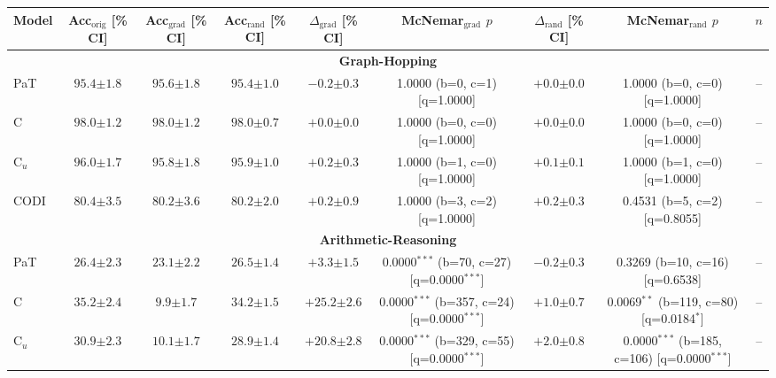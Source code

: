 \begin{table}[h!]
\centering
\small
\setlength{\tabcolsep}{3pt}
\begin{tabular}{l ccc cc cc c}
\toprule
Model & Acc$_{\text{orig}}$ [\% CI] & Acc$_{\text{grad}}$ [\% CI] & Acc$_{\text{rand}}$ [\% CI] & $\Delta_{\text{grad}}$ [\% CI] & McNemar$_{\text{grad}}$ $p$ & $\Delta_{\text{rand}}$ [\% CI] & McNemar$_{\text{rand}}$ $p$ & $n$ \\
\midrule
\multicolumn{9}{c}{\textbf{Graph-Hopping}} \\
\midrule
PaT & $95.4 {\scriptstyle \pm 1.8}$ & $95.6 {\scriptstyle \pm 1.8}$ & $95.4 {\scriptstyle \pm 1.0}$ & $-0.2 {\scriptstyle \pm 0.3}$ & 1.0000 (b=0, c=1) [q=1.0000] & $+0.0 {\scriptstyle \pm 0.0}$ & 1.0000 (b=0, c=0) [q=1.0000] & -- \\
C & $98.0 {\scriptstyle \pm 1.2}$ & $98.0 {\scriptstyle \pm 1.2}$ & $98.0 {\scriptstyle \pm 0.7}$ & $+0.0 {\scriptstyle \pm 0.0}$ & 1.0000 (b=0, c=0) [q=1.0000] & $+0.0 {\scriptstyle \pm 0.0}$ & 1.0000 (b=0, c=0) [q=1.0000] & -- \\
C$_u$ & $96.0 {\scriptstyle \pm 1.7}$ & $95.8 {\scriptstyle \pm 1.8}$ & $95.9 {\scriptstyle \pm 1.0}$ & $+0.2 {\scriptstyle \pm 0.3}$ & 1.0000 (b=1, c=0) [q=1.0000] & $+0.1 {\scriptstyle \pm 0.1}$ & 1.0000 (b=1, c=0) [q=1.0000] & -- \\
CODI & $80.4 {\scriptstyle \pm 3.5}$ & $80.2 {\scriptstyle \pm 3.6}$ & $80.2 {\scriptstyle \pm 2.0}$ & $+0.2 {\scriptstyle \pm 0.9}$ & 1.0000 (b=3, c=2) [q=1.0000] & $+0.2 {\scriptstyle \pm 0.3}$ & 0.4531 (b=5, c=2) [q=0.8055] & -- \\
\midrule
\multicolumn{9}{c}{\textbf{Arithmetic-Reasoning}} \\
\midrule
PaT & $26.4 {\scriptstyle \pm 2.3}$ & $23.1 {\scriptstyle \pm 2.2}$ & $26.5 {\scriptstyle \pm 1.4}$ & $+3.3 {\scriptstyle \pm 1.5}$ & 0.0000$^{***}$ (b=70, c=27) [q=0.0000$^{***}$] & $-0.2 {\scriptstyle \pm 0.3}$ & 0.3269 (b=10, c=16) [q=0.6538] & -- \\
C & $35.2 {\scriptstyle \pm 2.4}$ & $9.9 {\scriptstyle \pm 1.7}$ & $34.2 {\scriptstyle \pm 1.5}$ & $+25.2 {\scriptstyle \pm 2.6}$ & 0.0000$^{***}$ (b=357, c=24) [q=0.0000$^{***}$] & $+1.0 {\scriptstyle \pm 0.7}$ & 0.0069$^{**}$ (b=119, c=80) [q=0.0184$^{*}$] & -- \\
C$_u$ & $30.9 {\scriptstyle \pm 2.3}$ & $10.1 {\scriptstyle \pm 1.7}$ & $28.9 {\scriptstyle \pm 1.4}$ & $+20.8 {\scriptstyle \pm 2.8}$ & 0.0000$^{***}$ (b=329, c=55) [q=0.0000$^{***}$] & $+2.0 {\scriptstyle \pm 0.8}$ & 0.0000$^{***}$ (b=185, c=106) [q=0.0000$^{***}$] & -- \\

\end{tabular}
\end{table}
